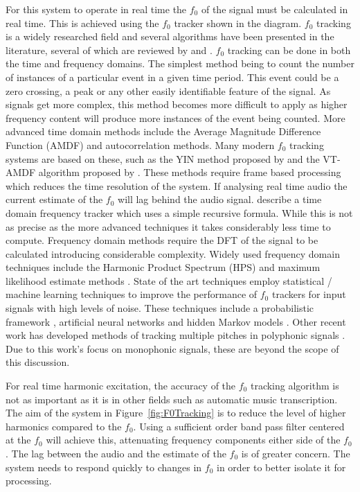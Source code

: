 		For this system to operate in real time the $f_{0}$ of the signal must be calculated in real time. This is
		achieved using the $f_{0}$ tracker shown in the diagram. $f_{0}$ tracking is a widely researched field and
		several algorithms have been presented in the literature, several of which are reviewed by
		\citet{cuadra2001efficient} and \citet{gerhard2003pitch}.  $f_{0}$ tracking can be done in both the time
		and frequency domains. The simplest method being to count the number of instances of a particular event in
		a given time period. This event could be a zero crossing, a peak or any other easily identifiable feature
		of the signal. As signals get more complex, this method becomes more difficult to apply as higher frequency
		content will produce more instances of the event being counted. More advanced time domain methods include
		the Average Magnitude Difference Function (AMDF) and autocorrelation methods. Many modern $f_{0}$ tracking
		systems are based on these, such as the YIN method proposed by \citet{decheveigne2002yin} and the VT-AMDF
		algorithm proposed by \citet{prukkanon2009vt-amdf}.  These methods require frame based processing which
		reduces the time resolution of the system. If analysing real time audio the current estimate of the $f_{0}$
		will lag behind the audio signal. \citet{larsen2004audio} describe a time domain frequency tracker which
		uses a simple recursive formula. While this is not as precise as the more advanced techniques it takes
		considerably less time to compute. Frequency domain methods require the DFT of the signal to be calculated
		introducing considerable complexity. Widely used frequency domain techniques include the Harmonic Product
		Spectrum (HPS) and maximum likelihood estimate methods \citep{noll1969pitch}. State of the art techniques
		employ statistical / machine learning techniques to improve the performance of $f_{0}$ trackers for input
		signals with high levels of noise. These techniques include a probabilistic framework \citep{chu2012safe},
		artificial neural networks \citep{han2014neural} and hidden Markov models \citep{wang2016f0}. Other recent
		work has developed methods of tracking multiple pitches in polyphonic signals \citep{christensen2008multi}.
		Due to this work's focus on monophonic signals, these are beyond the scope of this discussion.

		For real time harmonic excitation, the accuracy of the $f_{0}$ tracking algorithm is not as important as it
		is in other fields such as automatic music transcription. The aim of the system in
		Figure~\ref{fig:F0Tracking} is to reduce the level of higher harmonics compared to the $f_{0}$. Using a
		sufficient order band pass filter centered at the $f_{0}$ will achieve this, attenuating frequency
		components either side of the $f_{0}$. The lag between the audio and the estimate of the $f_{0}$ is of
		greater concern. The system needs to respond quickly to changes in $f_{0}$ in order to better isolate it
		for processing.

